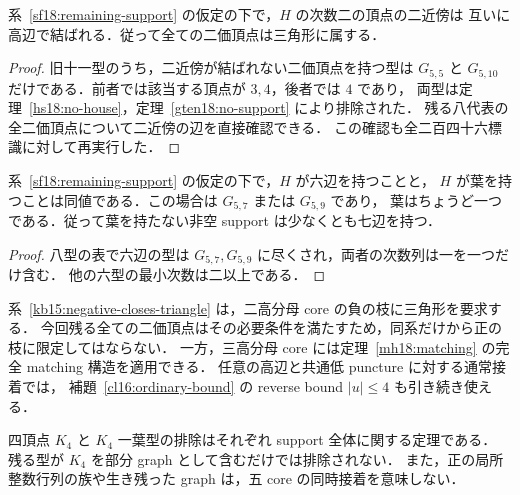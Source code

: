 \begin{corollary}[二価頂点は必ず三角形に属する]
\label{sf18:degree-two-triangle}
系~\ref{sf18:remaining-support} の仮定の下で，$H$ の次数二の頂点の二近傍は
互いに高辺で結ばれる．従って全ての二価頂点は三角形に属する．
\end{corollary}

\begin{proof}
旧十一型のうち，二近傍が結ばれない二価頂点を持つ型は
$G_{5,5}$ と $G_{5,10}$ だけである．前者では該当する頂点が $3,4$，後者では $4$ であり，
両型は定理~\ref{hs18:no-house}，定理~\ref{gten18:no-support} により排除された．
残る八代表の全二価頂点について二近傍の辺を直接確認できる．
この確認も全二百四十六標識に対して再実行した．
\end{proof}

\begin{corollary}[六辺と葉の存在]
\label{sf18:six-edge-leaf}
系~\ref{sf18:remaining-support} の仮定の下で，$H$ が六辺を持つことと，
$H$ が葉を持つことは同値である．この場合は $G_{5,7}$ または $G_{5,9}$ であり，
葉はちょうど一つである．従って葉を持たない非空 support は少なくとも七辺を持つ．
\end{corollary}

\begin{proof}
八型の表で六辺の型は $G_{5,7},G_{5,9}$ に尽くされ，両者の次数列は一を一つだけ含む．
他の六型の最小次数は二以上である．
\end{proof}

系~\ref{kb15:negative-closes-triangle} は，二高分母 core の負の枝に三角形を要求する．
今回残る全ての二価頂点はその必要条件を満たすため，同系だけから正の枝に限定してはならない．
一方，三高分母 core には定理~\ref{mh18:matching} の完全 matching 構造を適用できる．
任意の高辺と共通低 puncture に対する通常接着では，
補題~\ref{cl16:ordinary-bound} の reverse bound $|u|\le4$ も引き続き使える．

四頂点 $K_4$ と $K_4$ 一葉型の排除はそれぞれ support 全体に関する定理である．
残る型が $K_4$ を部分 graph として含むだけでは排除されない．
また，正の局所整数行列の族や生き残った graph は，五 core の同時接着を意味しない．
